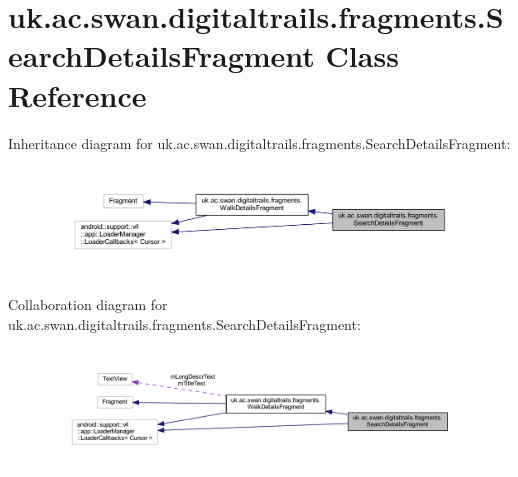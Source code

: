 \hypertarget{classuk_1_1ac_1_1swan_1_1digitaltrails_1_1fragments_1_1_search_details_fragment}{\section{uk.\+ac.\+swan.\+digitaltrails.\+fragments.\+Search\+Details\+Fragment Class Reference}
\label{classuk_1_1ac_1_1swan_1_1digitaltrails_1_1fragments_1_1_search_details_fragment}
}


Inheritance diagram for uk.\+ac.\+swan.\+digitaltrails.\+fragments.\+Search\+Details\+Fragment\+:\nopagebreak
\begin{figure}[H]
\begin{center}
\leavevmode
\includegraphics[width=350pt]{classuk_1_1ac_1_1swan_1_1digitaltrails_1_1fragments_1_1_search_details_fragment__inherit__graph}
\end{center}
\end{figure}


Collaboration diagram for uk.\+ac.\+swan.\+digitaltrails.\+fragments.\+Search\+Details\+Fragment\+:\nopagebreak
\begin{figure}[H]
\begin{center}
\leavevmode
\includegraphics[width=350pt]{classuk_1_1ac_1_1swan_1_1digitaltrails_1_1fragments_1_1_search_details_fragment__coll__graph}
\end{center}
\end{figure}
